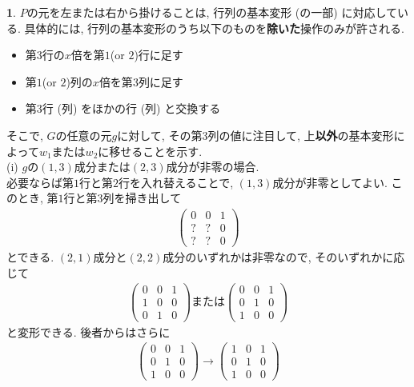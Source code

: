 \documentclass{article}
\theoremstyle{definition}
\newtheorem{ans}{}
\numberwithin{ans}{subsection}
\begin{document}
\begin{ans}
  $P$の元を左または右から掛けることは, 行列の基本変形 (の一部) に対応している.
  具体的には, 行列の基本変形のうち以下のものを\textbf{除いた}操作のみが許される.
  \begin{itemize}
    \item 第$3$行の$x$倍を第$1$(or $2$)行に足す
    \item 第$1$(or $2$)列の$x$倍を第$3$列に足す
    \item 第$3$行 (列) をほかの行 (列) と交換する
  \end{itemize}
  そこで, $G$の任意の元$g$に対して, その第$3$列の値に注目して,
  上\textbf{以外}の基本変形によって$w_1$または$w_2$に移せることを示す.\\
  (i) $g$の$(1, 3)$成分または$(2, 3)$成分が非零の場合.\\
  必要ならば第$1$行と第$2$行を入れ替えることで, $(1, 3)$成分が非零としてよい.
  このとき, 第$1$行と第$3$列を掃き出して
  \begin{align*}
    \begin{pmatrix}
      0 & 0 & 1 \\
      ? & ? & 0 \\
      ? & ? & 0
    \end{pmatrix}
  \end{align*}
  とできる. $(2, 1)$成分と$(2, 2)$成分のいずれかは非零なので, そのいずれかに応じて
  \begin{align*}
    \begin{pmatrix}
      0 & 0 & 1 \\
      1 & 0 & 0 \\
      0 & 1 & 0
    \end{pmatrix}または
    \begin{pmatrix}
      0 & 0 & 1 \\
      0 & 1 & 0 \\
      1 & 0 & 0
    \end{pmatrix}
  \end{align*}
  と変形できる. 後者からはさらに
  \begin{align*}
    \begin{pmatrix}
      0 & 0 & 1 \\
      0 & 1 & 0 \\
      1 & 0 & 0
    \end{pmatrix}
    \rightarrow
    \begin{pmatrix}
      1 & 0 & 1 \\
      0 & 1 & 0 \\
      1 & 0 & 0

\end{pmatrix}
\end{align*}
\end{ans}
\end{document}
